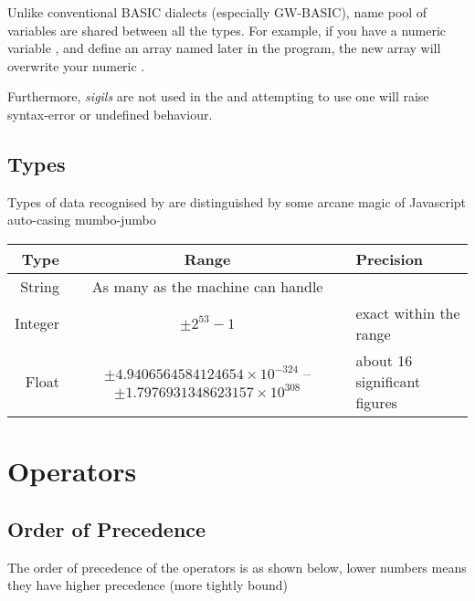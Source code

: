 Unlike conventional BASIC dialects (especially GW-BASIC), name pool of variables are shared between all the types. For example, if you have a numeric variable , and define an array named  later in the program, the new array will overwrite your numeric .

Furthermore, \emph{sigils} are not used in the \tbas{} and attempting to use one will raise syntax-error or undefined behaviour.

\subsection{Types}

Types of data recognised by \tbas{} are distinguished by some arcane magic of Javascript auto-casing mumbo-jumbo

\begin{tabulary}{\textwidth}{RCL}
Type & Range & Precision \\
\hline \hline
String & As many as the machine can handle & \, \\
\hline
Integer & $ \pm 2^{53}-1 $ & exact within the range \\
\hline
Float & $ \pm 4.9406564584124654 \times 10^{-324} $ -- $ \pm 1.7976931348623157 \times 10^{308} $ & about 16 significant figures \\
\end{tabulary}

\section{Operators}
\subsection{Order of Precedence}

The order of precedence of the operators is as shown below, lower numbers means they have higher precedence (more tightly bound)

